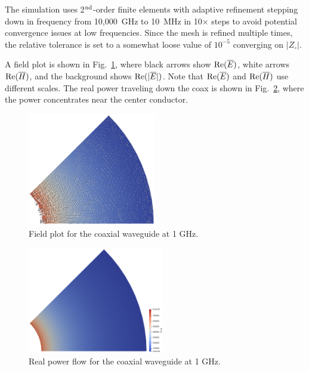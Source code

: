 \documentclass[titlepage]{article}
\renewcommand\_{\textunderscore\linebreak[1]}
\begin{document}
The simulation uses 2$^{\textnormal{nd}}$-order finite elements with adaptive refinement stepping down in frequency from 10,000~GHz to 10~MHz in 10$\times$ steps to avoid potential convergence issues at low frequencies.  Since the mesh is refined multiple times, the relative tolerance is set to a somewhat loose value of $10^{-5}$ converging on $|Z_{\circ}|$.

A field plot is shown in Fig.~\ref{fig:coax_field}, where black arrows show $\textnormal{Re}(\overline{E})$, white arrows $\textnormal{Re}(\overline{H})$, and the background shows $\textnormal{Re}(|\overline{E}|)$.  Note that $\textnormal{Re}(\overline{E})$ and $\textnormal{Re}(\overline{H})$ use different scales. The real power traveling down the coax is shown in Fig.~\ref{fig:coax_Pz}, where the power concentrates near the center conductor.

\begin{figure}[H]
  \centering
  \includegraphics[width=0.5\textwidth]{../regression/OpenParEM2D/coaxEighth_study/screenshots/coax_field}
  \caption{Field plot for the coaxial waveguide at 1 GHz.}
  \label{fig:coax_field}
\end{figure}

\begin{figure}[H]
  \centering
  \includegraphics[width=0.53\textwidth]{../regression/OpenParEM2D/coaxEighth_study/screenshots/coax_Pz}
  \caption{Real power flow for the coaxial waveguide at 1 GHz.}
  \label{fig:coax_Pz}
\end{figure}
\end{document}
